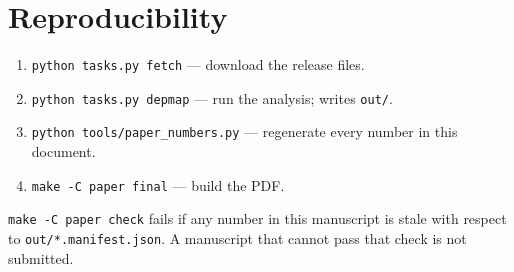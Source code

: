 \section{Reproducibility}
\label{app:repro}

\begin{enumerate}
  \item \texttt{python tasks.py fetch} --- download the release files.
  \item \texttt{python tasks.py depmap} --- run the analysis; writes \texttt{out/}.
  \item \texttt{python tools/paper\_numbers.py} --- regenerate every number in this document.
  \item \texttt{make -C paper final} --- build the PDF.
\end{enumerate}

\texttt{make -C paper check} fails if any number in this manuscript is stale with respect to
\texttt{out/*.manifest.json}. A manuscript that cannot pass that check is not submitted.
